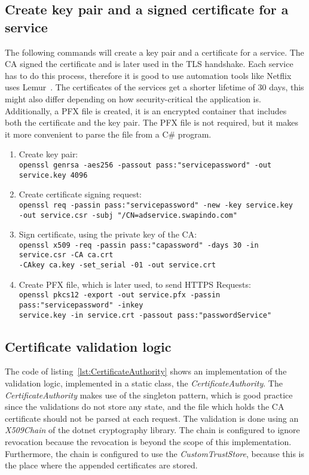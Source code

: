 \subsection{Create key pair and a signed certificate for a service} \label{sec:createkeypair}
The following commands will create a key pair and a certificate for a service. 
The CA signed the certificate and is later used in the TLS handshake.
Each service has to do this process, therefore it is good to use automation tools like Netflix uses Lemur~\cite{dias2020microservices}.
The certificates of the services get a shorter lifetime of 30 days, this might also differ depending on how security-critical the application is. 
Additionally, a PFX file is created, it is an encrypted container that includes both the certificate and the key pair.
The PFX file is not required, but it makes it more convenient to parse the file from a C\# program.
\begin{enumerate}
    \item Create key pair: \\ 
    \lstinline{openssl genrsa -aes256 -passout pass:"servicepassword" -out service.key 4096}
    \item Create certificate signing request: \\
    \lstinline{openssl req -passin pass:"servicepassword" -new -key service.key} \\
    \lstinline{-out service.csr -subj "/CN=adservice.swapindo.com"}
    \item Sign certificate, using the private key of the CA: \\
    \lstinline{openssl x509 -req -passin pass:"capassword" -days 30 -in service.csr -CA ca.crt} \\
    \lstinline{-CAkey ca.key -set_serial -01 -out service.crt}
    \item Create PFX file, which is later used, to send HTTPS Requests: \\
    \lstinline{openssl pkcs12 -export -out service.pfx -passin pass:"servicepassword" -inkey} \\ 
    \lstinline{service.key -in service.crt -passout pass:"passwordService"}
\end{enumerate}

\subsection{Certificate validation logic}
The code of listing~\ref{lst:CertificateAuthority} shows an implementation of the validation logic, implemented in a static class, the \textit{CertificateAuthority}.
The \textit{CertificateAuthority} makes use of the singleton pattern, which is good practice since the validations do not store any state, and the file which holds the CA certificate should not be parsed at each request.
The validation is done using an \textit{X509Chain} of the dotnet cryptography library.
The chain is configured to ignore revocation because the revocation is beyond the scope of this implementation.
Furthermore, the chain is configured to use the \textit{CustomTrustStore}, because this is the place where the appended certificates are stored.

